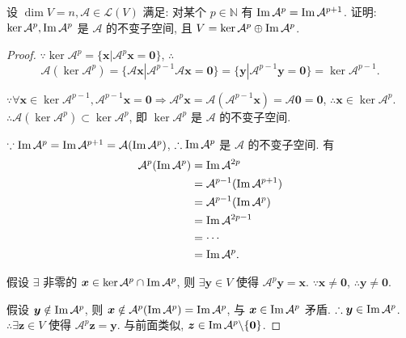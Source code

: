 \documentclass[color=black,device=normal,lang=cn,mode=geye]{elegantnote}
\begin{document}
\begin{exercise}\label{ex3.3}
    设 $\dim V=n,\mathcal{A}\in\mathcal{L}(V)$ 满足: 对某个 $p\in\mathbb{N}$ 有 $\operatorname{Im} \mathcal{A}^p=\operatorname{Im} \mathcal{A}^{p+1}$. 证明: $\ker\mathcal{A}^p,\operatorname{Im} \mathcal{A}^p$ 是 $\mathcal{A}$ 的不变子空间, 且 $V=\ker\mathcal{A}^p\oplus\operatorname{Im} \mathcal{A}^p$.
\end{exercise}
\begin{proof}
    $\because\ker\mathcal{A}^p=\{\boldsymbol{x}|\mathcal{A}^p\boldsymbol{x}=\boldsymbol{0}\}$, $\therefore$
    \[\mathcal{A}(\ker\mathcal{A}^p)=\{\mathcal{A}\boldsymbol{x}|\mathcal{A}^{p-1}\mathcal{A}\boldsymbol{x}=\boldsymbol{0}\}=\{\boldsymbol{y}|\mathcal{A}^{p-1}\boldsymbol{y}=\boldsymbol{0}\}=\ker\mathcal{A}^{p-1}.\]

    $\because\forall\boldsymbol{x}\in\ker\mathcal{A}^{p-1},\mathcal{A}^{p-1}\boldsymbol{x}=\boldsymbol{0}\Rightarrow\mathcal{A}^p\boldsymbol{x}=\mathcal{A}(\mathcal{A}^{p-1}\boldsymbol{x})=\mathcal{A}\boldsymbol{0}=\boldsymbol{0}$, $\therefore\boldsymbol{x}\in\ker\mathcal{A}^p$. $\therefore\mathcal{A}(\ker\mathcal{A}^p)\subset\ker\mathcal{A}^p$, 即 $\ker\mathcal{A}^p$ 是 $\mathcal{A}$ 的不变子空间.

    $\because\operatorname{Im} \mathcal{A}^p=\operatorname{Im} \mathcal{A}^{p+1}=\mathcal{A}(\operatorname{Im} \mathcal{A}^p)$, $\therefore\operatorname{Im} \mathcal{A}^p$ 是 $\mathcal{A}$ 的不变子空间. 有
    \begin{align*}
        \mathcal{A}^p(\operatorname{Im} \mathcal{A}^p) & =\operatorname{Im}\mathcal{A}^{2p} \\
        & =\mathcal{A}^{p-1}(\operatorname{Im}\mathcal{A}^{p+1}) \\
        & =\mathcal{A}^{p-1}(\operatorname{Im}\mathcal{A}^p) \\
        & =\operatorname{Im}\mathcal{A}^{2p-1} \\
        & =\cdots \\
        & =\operatorname{Im}\mathcal{A}^p.
    \end{align*}

    假设 $\exists$ 非零的 $\boldsymbol{x}\in\ker\mathcal{A}^p\cap\operatorname{Im} \mathcal{A}^p$, 则 $\exists\boldsymbol{y}\in V$ 使得 $\mathcal{A}^p\boldsymbol{y}=\boldsymbol{x}$. $\because\boldsymbol{x}\neq\boldsymbol{0}$, $\therefore\boldsymbol{y}\neq\boldsymbol{0}$.

    假设 $\boldsymbol{y}\notin\operatorname{Im} \mathcal{A}^p$, 则 $\boldsymbol{x}\notin\mathcal{A}^p(\operatorname{Im} \mathcal{A}^p)=\operatorname{Im} \mathcal{A}^p$, 与 $\boldsymbol{x}\in\operatorname{Im} \mathcal{A}^p$ 矛盾. $\therefore\boldsymbol{y}\in\operatorname{Im} \mathcal{A}^p$. $\therefore\exists\boldsymbol{z}\in V$ 使得 $\mathcal{A}^p\boldsymbol{z}=\boldsymbol{y}$. 与前面类似, $\boldsymbol{z}\in\operatorname{Im} \mathcal{A}^p\backslash\{\boldsymbol{0}\}$.


\end{proof}
\end{document}
